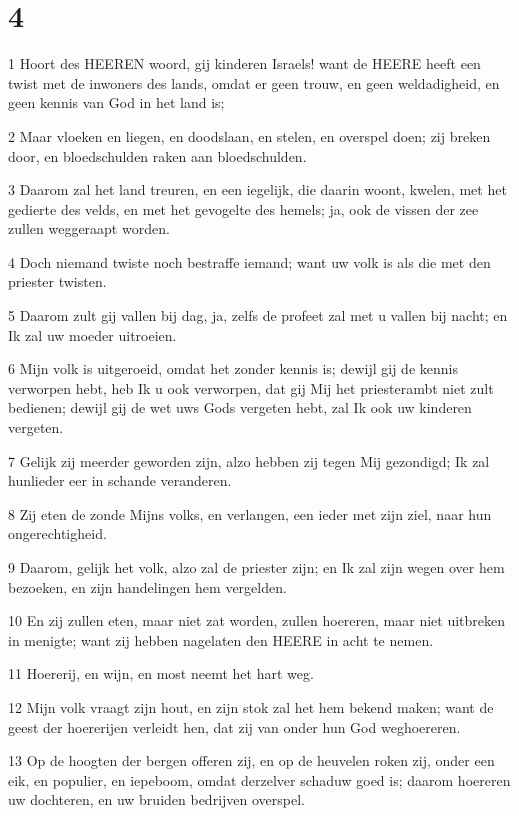 \chapter{4}

\par 1 Hoort des HEEREN woord, gij kinderen Israels! want de HEERE heeft een twist met de inwoners des lands, omdat er geen trouw, en geen weldadigheid, en geen kennis van God in het land is;
\par 2 Maar vloeken en liegen, en doodslaan, en stelen, en overspel doen; zij breken door, en bloedschulden raken aan bloedschulden.
\par 3 Daarom zal het land treuren, en een iegelijk, die daarin woont, kwelen, met het gedierte des velds, en met het gevogelte des hemels; ja, ook de vissen der zee zullen weggeraapt worden.
\par 4 Doch niemand twiste noch bestraffe iemand; want uw volk is als die met den priester twisten.
\par 5 Daarom zult gij vallen bij dag, ja, zelfs de profeet zal met u vallen bij nacht; en Ik zal uw moeder uitroeien.
\par 6 Mijn volk is uitgeroeid, omdat het zonder kennis is; dewijl gij de kennis verworpen hebt, heb Ik u ook verworpen, dat gij Mij het priesterambt niet zult bedienen; dewijl gij de wet uws Gods vergeten hebt, zal Ik ook uw kinderen vergeten.
\par 7 Gelijk zij meerder geworden zijn, alzo hebben zij tegen Mij gezondigd; Ik zal hunlieder eer in schande veranderen.
\par 8 Zij eten de zonde Mijns volks, en verlangen, een ieder met zijn ziel, naar hun ongerechtigheid.
\par 9 Daarom, gelijk het volk, alzo zal de priester zijn; en Ik zal zijn wegen over hem bezoeken, en zijn handelingen hem vergelden.
\par 10 En zij zullen eten, maar niet zat worden, zullen hoereren, maar niet uitbreken in menigte; want zij hebben nagelaten den HEERE in acht te nemen.
\par 11 Hoererij, en wijn, en most neemt het hart weg.
\par 12 Mijn volk vraagt zijn hout, en zijn stok zal het hem bekend maken; want de geest der hoererijen verleidt hen, dat zij van onder hun God weghoereren.
\par 13 Op de hoogten der bergen offeren zij, en op de heuvelen roken zij, onder een eik, en populier, en iepeboom, omdat derzelver schaduw goed is; daarom hoereren uw dochteren, en uw bruiden bedrijven overspel.
